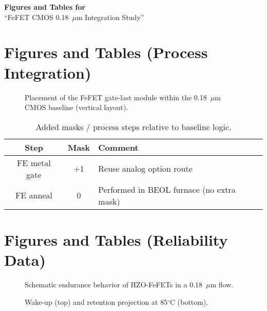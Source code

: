 \documentclass[conference]{IEEEtran}
\begin{document}
\begin{center}
    {\LARGE \textbf{Figures and Tables for}\\[0.5em]
    \Large ``FeFET CMOS 0.18~$\mu$m Integration Study''}
\end{center}
\vspace{1em}

\section*{Figures and Tables (Process Integration)}

\begin{figure}[!t]
\centering
\caption{Placement of the FeFET gate-last module within the 0.18~$\mu$m CMOS baseline (vertical layout).}
\end{figure}

\vspace{2em} %

\begin{table}[!t]
\centering
\caption{Added masks / process steps relative to baseline logic.}
\begin{tabular}{|c|c|l|}\hline
Step & Mask & Comment\\ \hline
FE metal gate & +1 & Reuse analog option route\\
FE anneal & 0 & Performed in BEOL furnace (no extra mask)\\ \hline
\end{tabular}
\end{table}

\newpage

\section*{Figures and Tables (Reliability Data)}

\begin{figure}[!t]
\centering
\caption{Schematic endurance behavior of HZO-FeFETs in a 0.18~$\mu$m flow.}
\end{figure}

\begin{figure}[!t]
\centering
\caption{Wake-up (top) and retention projection at 85$^\circ$C (bottom).}
\end{figure}
\end{document}
